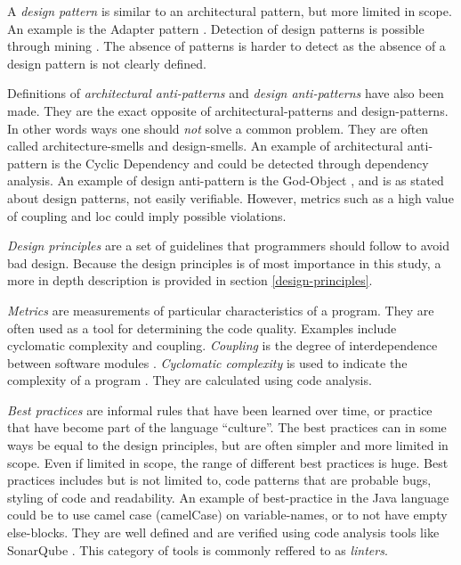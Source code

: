 \documentclass{report}
\begin{document}
A \textit{design pattern} is similar to an architectural pattern, but more limited in scope. An example is the Adapter pattern \cite{Adapterp54:online}. Detection of design patterns is possible through mining \cite{TEKIN2014406}. The absence of patterns is harder to detect as the absence of a design pattern is not clearly defined.

Definitions of \textit{architectural anti-patterns} and \textit{design anti-patterns} have also been made. They are the exact opposite of architectural-patterns and design-patterns. In other words ways one should {\em not} solve a common problem. They are often called architecture-smells and design-smells. An example of architectural anti-pattern is the Cyclic Dependency \cite{cyclicdependency} and could be detected through dependency analysis. An example of design anti-pattern is the God-Object \cite{Godobjec14:online}, and is as stated about design patterns, not easily verifiable. However, metrics such as a high value of coupling and \gls{loc} could imply possible violations.


\textit{Design principles} are a set of guidelines that programmers should follow to avoid bad design. Because the design principles is of most importance in this study, a more in depth description is provided in section \ref{design-principles}.

\textit{Metrics} are measurements of particular characteristics of a program. They are often used as a tool for determining the code quality. Examples include cyclomatic complexity and coupling. \textit{Coupling} is the degree of interdependence between software modules \cite{Coupling2:online}. \textit{Cyclomatic complexity} is used to indicate the complexity of a program \cite{Cyclomat54:online}. They are calculated using code analysis.

\textit{Best practices} are informal rules that have been learned over time, or practice that have become part of the language ``culture''. The best practices can in some ways be equal to the design principles, but are often simpler and more limited in scope. Even if limited in scope, the range of different best practices is huge. Best practices includes but is not limited to, code patterns that are probable bugs, styling of code and readability. An example of best-practice in the Java language could be to use camel case (camelCase) \cite{camelcase} on variable-names, or to not have empty else-blocks. They are well defined and are verified using code analysis tools like SonarQube \cite{sonarqube}. This category of tools is commonly reffered to as \textit{linters}.
\end{document}
